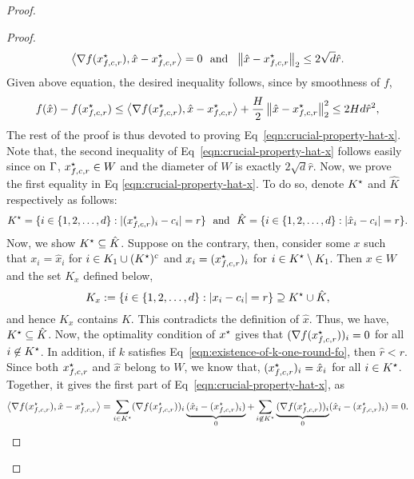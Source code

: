 \begin{proof}
\begin{proof}
\begin{equation}
\label{eqn:crucial-property-hat-x}
\left<\nabla f(x_{f, c, r}^\star), \hat{x} - x_{f, c, r}^\star\right> = 0
	~~\text{and}~~\left\|{\hat{x} - x_{f, c, r}^\star}\right\|_2\leq 2\sqrt{d} \hat{r}.
\end{equation}
Given above equation, the desired inequality follows, since by smoothness of $f$,  
\begin{equation*}
f(\hat{x}) - f(x_{f, c, r}^\star) \leq 
	\left<\nabla f(x_{f, c, r}^\star), \hat{x} - x_{f, c, r}^\star\right> 
		+ \frac{H}{2} \left\|{\hat{x} - x_{f, c, r}^\star}\right\|_2^2 
	\leq  2 Hd \hat{r}^2, 
\end{equation*}
The rest of the proof is thus devoted to proving Eq~\eqref{eqn:crucial-property-hat-x}.
Note that, the second inequality of Eq~\eqref{eqn:crucial-property-hat-x} follows 
easily since on $\Gamma$, $x_{f, c, r}^\star \in W$ and the diameter of $W$ is exactly 
$2\sqrt{d} \hat{r}$. Now, we prove the first equality in Eq 
\eqref{eqn:crucial-property-hat-x}. To do so, denote $K^\star$ and $\hat{K}$
respectively as follows: 
\begin{equation*}
K^\star = \{i\in \{1, 2, \ldots, d\}: |(x_{f, c, r}^\star)_i - c_i| = r\}~~\text{and}~~
\hat{K} = \{i\in \{1, 2, \ldots, d\}: |\hat{x}_i - c_i| = r\}.
\end{equation*}
Now, we show $K^\star \subseteq \hat{K}$. Suppose on the contrary, then, 
consider some $x$ such that $x_i = \hat{x}_{i}$ for $i\in K_1 \cup (K^\star)^c$ 
and $x_i = (x_{f, c, r}^\star)_i$ for $i\in K^\star \setminus K_1$. Then $x\in W$ 
and the set $K_x$ defined below, 
\begin{equation*}
K_x := \{i\in \{1, 2, \ldots, d\} : |x_i - c_i| = r \} \supseteq K^\star \cup \hat{K},
\end{equation*}
and hence $K_x$ contains $K$. This contradicts the definition of $\hat{x}$. Thus, we have, 
$K^\star \subseteq \hat{K}$. Now, the optimality condition of $x^\star$ gives
that $(\nabla f(x_{f, c, r}^\star))_i = 0$ for all $i\not\in K^\star$. In addition, if 
$k$ satisfies Eq~\eqref{eqn:existence-of-k-one-round-fo}, then $\hat{r} < r$. 
Since both $x_{f, c, r}^\star$ and $\hat{x}$ belong to $W$, we know that, 
$(x_{f, c, r}^\star)_i = \hat{x}_{i}$ for all $i\in K^\star$. Together, it gives the first
part of Eq~\eqref{eqn:crucial-property-hat-x}, as
\begin{equation*}
\left<\grad f(x_{f, c, r}\opt), \hat{x} - x_{f, c, r}\opt\right> = 
	\sum_{i\in K\opt}(\grad f(x_{f, c, r}\opt))_i \underbrace{(\hat{x}_{i} - (x_{f, c, r}\opt)_i)}_0
	+ \sum_{i\not\in K\opt}\underbrace{(\grad f(x_{f, c, r}\opt))_i}_0 (\hat{x}_{i} - (x_{f, c, r}\opt)_i) = 0.

\end{equation*}
\end{proof}
\end{proof}
